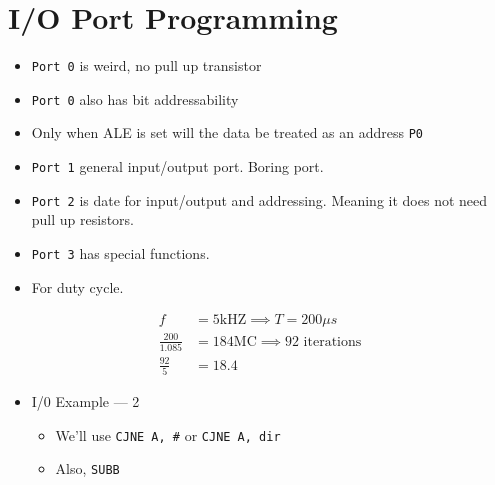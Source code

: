 \documentclass[12pt]{article}
\begin{document}
\section{I/O Port Programming}
\begin{itemize}
    \item \texttt{Port 0} is weird, no pull up transistor
    \item \texttt{Port 0} also has bit addressability
    \item Only when ALE is set will the data be treated as an address \texttt{P0}
    \item \texttt{Port 1} general input/output port. Boring port.
    \item \texttt{Port 2} is date for input/output and addressing. Meaning it does not need pull up resistors.
    \item \texttt{Port 3} has special functions.
    \item For duty cycle.
\end{itemize}

\begin{align}
    f &= 5 \text{kHZ} \implies T = 200 \mu s \\
    \frac{200}{1.085} &= 184 \text{MC} \implies 92 \text{ iterations} \\
    \frac{92}{5} &= 18.4
\end{align}

\begin{itemize}
    \item I/0 Example --- 2
    \begin{itemize}
        \item We'll use \texttt{CJNE A, \#} or \texttt{CJNE A, dir}
        \item Also, \texttt{SUBB}
    \end{itemize}
\end{itemize}
\end{document}
